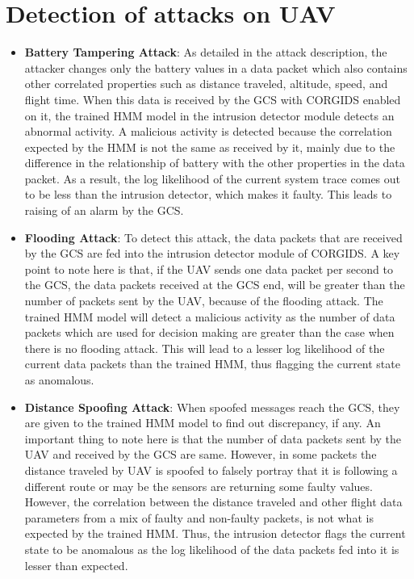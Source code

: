 \section{Detection of attacks on \ac{UAV}}
\begin{itemize}
\item {\bf Battery Tampering Attack}: As detailed in the attack description, the attacker changes only the battery values in a data packet which also contains other correlated properties such as distance traveled, altitude, speed, and flight time. When this data is received by the \ac{GCS} with \ac{CORGIDS} enabled on it, the trained HMM model in the intrusion detector module detects an abnormal activity. A malicious activity is detected because the correlation expected by the \ac{HMM} is not the same as received by it, mainly due to the difference in the relationship of battery with the other properties in the data packet. As a result, the log likelihood of the current system trace comes out to be less than the intrusion detector, which makes it faulty. This leads to raising of an alarm by the \ac{GCS}.

\item {\bf Flooding Attack}: To detect this attack, the data packets that are received by the \ac{GCS} are fed into the intrusion detector module of \ac{CORGIDS}. A key point to note here is that, if the \ac{UAV} sends one data packet per second to the \ac{GCS}, the data packets received at the \ac{GCS} end, will be greater than the number of packets sent by the \ac{UAV}, because of the flooding attack. The trained \ac{HMM} model will detect a malicious activity as the number of data packets which are used for decision making are greater than the case when there is no flooding attack. This will lead to a lesser log likelihood of the current data packets than the trained \ac{HMM}, thus flagging the current state as anomalous.

\item {\bf Distance Spoofing Attack}: When spoofed messages reach the \ac{GCS}, they are given to the trained \ac{HMM} model to find out discrepancy, if any. An important thing to note here is that the number of data packets sent by the \ac{UAV} and received by the \ac{GCS} are same. However, in some packets the distance traveled by \ac{UAV} is spoofed to falsely portray that it is following a different route or may be the sensors are returning some faulty values. However, the correlation between the distance traveled and other flight data parameters from a mix of faulty and non-faulty packets, is not what is expected by the trained \ac{HMM}. Thus, the intrusion detector flags the current state to be anomalous as the log likelihood of the data packets fed into it is lesser than expected.
\end{itemize}

